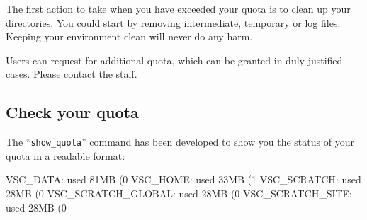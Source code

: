 \begin{tip}
The first action to take when you have exceeded your quota is
to clean up your directories. You could start by removing intermediate,
temporary or log files.  Keeping your environment clean will never do any harm.
\end{tip}

\begin{tip}
Users can request for additional quota, which can be granted in
duly justified cases. Please contact the \hpcTeam staff.
\end{tip}

\subsection{Check your quota}




The ``\texttt{show\_quota}'' command has been developed to show you the
status of your quota in a readable format:

\begin{prompt}
VSC_DATA:    used 81MB (0%
VSC_HOME:    used 33MB (1%
VSC_SCRATCH:   used 28MB (0%
VSC_SCRATCH_GLOBAL: used 28MB (0%
VSC_SCRATCH_SITE:   used 28MB (0%
\end{prompt}

